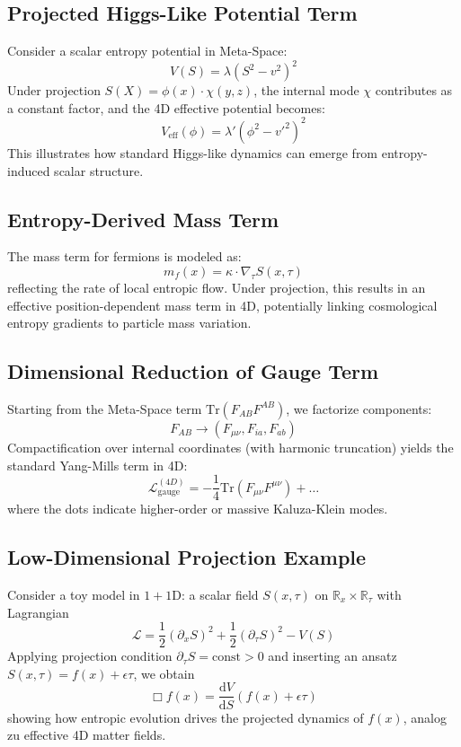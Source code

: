 \documentclass[10.5pt,a4paper]{article}
\begin{document}
\subsection{Projected Higgs-Like Potential Term}
Consider a scalar entropy potential in Meta-Space:
\[
V(S) = \lambda (S^2 - v^2)^2
\]
Under projection \( S(X) = \phi(x) \cdot \chi(y,z) \), the internal mode \( \chi \) contributes as a constant factor, and the 4D effective potential becomes:
\[
V_{\text{eff}}(\phi) = \lambda' (\phi^2 - v'^2)^2
\]
This illustrates how standard Higgs-like dynamics can emerge from entropy-induced scalar structure.

\subsection{Entropy-Derived Mass Term}
The mass term for fermions is modeled as:
\[
m_f(x) = \kappa \cdot \nabla_\tau S(x,\tau)
\]
reflecting the rate of local entropic flow. Under projection, this results in an effective position-dependent mass term in 4D,
potentially linking cosmological entropy gradients to particle mass variation.

\subsection{Dimensional Reduction of Gauge Term}
Starting from the Meta-Space term \( \mathrm{Tr}(F_{AB}F^{AB}) \), we factorize components:
\[
F_{AB} \rightarrow (F_{\mu\nu}, F_{ia}, F_{ab})
\]
Compactification over internal coordinates (with harmonic truncation) yields the standard Yang-Mills term in 4D:
\[
\mathcal{L}_{\text{gauge}}^{(4D)} = -\frac{1}{4} \mathrm{Tr}(F_{\mu\nu}F^{\mu\nu}) + \dots
\]
where the dots indicate higher-order or massive Kaluza-Klein modes.

\subsection{Low-Dimensional Projection Example}
Consider a toy model in \(1+1\)D: a scalar field \( S(x,\tau) \) on \( \mathbb{R}_x \times \mathbb{R}_\tau \) with Lagrangian
\[
\mathcal{L} = \frac{1}{2}(\partial_x S)^2 + \frac{1}{2}(\partial_\tau S)^2 - V(S)
\]
Applying projection condition \( \partial_\tau S = \text{const} > 0 \) and inserting an ansatz \( S(x,\tau) = f(x) + \epsilon\tau \), we obtain
\[
\Box f(x) = \frac{\mathrm{d}V}{\mathrm{d}S}(f(x) + \epsilon\tau)
\]
showing how entropic evolution drives the projected dynamics of \( f(x) \), analog zu effective 4D matter fields.
\end{document}
